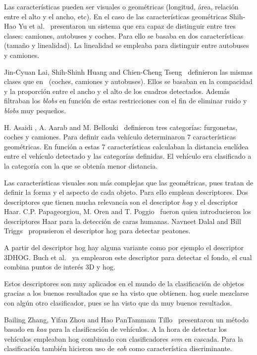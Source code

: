 Las características pueden ser visuales o geométricas (longitud, área, relación  entre el alto y el ancho, etc). En el caso de las características geométricas Shih-Hao Yu et al.~\cite{an_Automatic_traffic} presentaron un sistema que era capaz de distinguir entre tres clases: camiones, autobuses y coches. Para ello se basaba en dos características (tamaño y linealidad). La linealidad se empleaba para distinguir entre autobuses y camiones.

Jin-Cyuan Lai, Shih-Shinh Huang and Chien-Cheng Tseng~\cite{image_based_vehicle} definieron las mismas clases que en ~\cite{an_Automatic_traffic}(coches, camiones y autobuses). Ellos se basaban en la compacidad y la proporción entre el ancho y el alto de los cuadros detectados. Además filtraban los \textit{blobs} en función de estas restricciones con el fin de eliminar ruido y \textit{blobs} muy pequeños.

H. Asaidi , A. Aarab and M. Bellouki~\cite{shadow_elimination} definieron tres categorías: furgonetas, coches y camiones. Para definir cada vehículo determinaron 7 características geométricas. En función a estas 7 características calculaban la distancia euclídea entre el vehículo detectado y las categorías definidas. El vehículo era clasificado a la categoría con la que se obtenía menor distancia.

Las características visuales son más complejas que las geométricas, pues tratan de definir la forma y el aspecto de cada objeto. Para ello emplean descriptores. Dos descriptores que tienen mucha relevancia son el descriptor \textit{\acrfull{hog}} y el descriptor Haar. C.P. Papageorgiou, M. Oren and T. Poggio~\cite{haar_paper} fueron quien introducieron los descriptores Haar para la detección de caras humanas. Navneet Dalal and Bill Triggs~\cite{hog_paper} propusieron el descriptor \acrshort{hog} para detectar peatones.

A partir del descriptor \acrshort{hog} hay alguna variante como por ejemplo el descriptor 3DHOG. Buch et al.~\cite{3dhog_article} ya emplearon este descriptor para detectar el fondo, el cual combina puntos de interés 3D y \acrshort{hog}.

Estos descriptores son muy aplicados en el mundo de la clasificación de objetos gracias a los buenos resultados que se ha visto que obtienen. \acrshort{hog} suele mezclarse con algún otro clasificador, pues se ha visto que da muy buenos resultados.

Bailing Zhang, Yifan Zhou and Hao PanTammam Tillo~\cite{hybrid_model} presentaron un método basado en \textit{\acrfull{kaa}} para la clasificación de vehículos. A la hora de detectar los vehículos empleaban \acrshort{hog} combinado con clasificadores \textit{\acrfull{svm}} en cascada. Para la clasificación también hicieron uso de \textit{\acrfull{eoh}} como característica discriminante.

